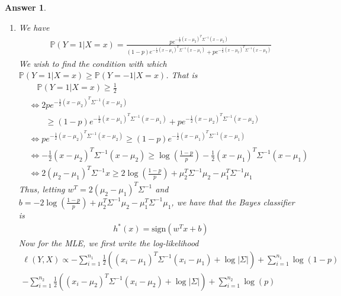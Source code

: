 \documentclass[12pt]{article}
\theoremstyle{colon}
\newtheorem*{answer}{Answer}
\begin{document}
\begin{answer}
  \leavevmode
  \begin{enumerate}[label=\arabic*)]
    \item We have
      \begin{gather*}
        \mathbb{P}(Y=1 | X=x) = \frac{p e^{-\frac{1}{2} (x - \mu_2)^T \Sigma^{-1} (x - \mu_2)}}{(1-p)e^{-\frac{1}{2} (x - \mu_1)^T \Sigma^{-1} (x - \mu_1)} + p e^{-\frac{1}{2} (x - \mu_2)^T \Sigma^{-1} (x - \mu_2)}}
      \end{gather*}
      We wish to find the condition with which $\mathbb{P}(Y = 1 | X=x) \geq \mathbb{P}(Y = -1 | X=x)$. That is
      \begin{align*}
        &\quad \mathbb{P}(Y = 1 | X=x) \geq \frac{1}{2} \\
        &\Longleftrightarrow 2p e^{-\frac{1}{2} (x - \mu_2)^T \Sigma^{-1} (x - \mu_2)} \\
        &\quad \quad \geq (1-p)e^{-\frac{1}{2} (x - \mu_1)^T \Sigma^{-1} (x - \mu_1)} + p e^{-\frac{1}{2} (x - \mu_2)^T \Sigma^{-1} (x - \mu_2)} \\
        &\Longleftrightarrow p e^{-\frac{1}{2} (x - \mu_2)^T \Sigma^{-1} (x - \mu_2)} \geq (1-p)e^{-\frac{1}{2} (x - \mu_1)^T \Sigma^{-1} (x - \mu_1)} \\
        &\Longleftrightarrow -\frac{1}{2} (x - \mu_2)^T \Sigma^{-1} (x - \mu_2) \geq \log \left( \frac{1-p}{p} \right) -\frac{1}{2} (x - \mu_1)^T \Sigma^{-1} (x - \mu_1) \\
        &\Longleftrightarrow 2(\mu_2 - \mu_1)^T \Sigma^{-1} x \geq 2 \log \left( \frac{1-p}{p} \right) + \mu_2^T \Sigma^{-1} \mu_2 - \mu_1^T \Sigma^{-1} \mu_1
      \end{align*}
      Thus, letting $w^T = 2(\mu_2 - \mu_1)^T \Sigma^{-1}$ and $b = -2\log \left( \frac{1-p}{p} \right) + \mu_2^T \Sigma^{-1} \mu_2 - \mu_1^T \Sigma^{-1} \mu_1$, we have that the Bayes classifier is
      \begin{gather*}
        h^*(x) = \text{sign}(w^T x + b)
      \end{gather*}
      Now for the MLE, we first write the log-likelihood
      \begin{gather*}
        \ell(Y,X) \propto - \sum_{i=1}^{n_1} \frac{1}{2} ((x_i - \mu_1)^T \Sigma^{-1}(x_i - \mu_1) + \log \lvert \Sigma \rvert) + \sum_{i=1}^{n_1} \log (1-p) \\
        - \sum_{i=1}^{n_2} \frac{1}{2} ((x_i - \mu_2)^T \Sigma^{-1}(x_i - \mu_2) + \log \lvert \Sigma \rvert) + \sum_{i=1}^{n_2} \log (p)
      \end{gather*}

\end{enumerate}
\end{answer}
\end{document}

